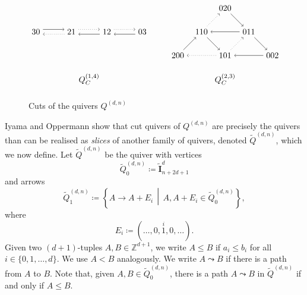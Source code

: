 \documentclass[ALCO,Unicode,published]{cedram}
\newcommand{\derset}[2]{{\tilde{\mathbf{I}}_{#1}^{#2}}}
\newcommand{\st}{\,\middle\vert\,} %
\newcommand{\set}[1]{\left\{#1\right\}} %
\newcommand{\ivec}{E_{i}} %
\newcommand{\tqdn}{\tilde{Q}^{(d, n)}}
\begin{document}
\begin{figure}
\caption{Cuts of the quivers $Q^{(d, n)}$}\label{fig:qdn_cuts}
\[
\begin{tikzpicture}


\begin{scope}[shift={(-3,1)},xscale=1.5]

\node(30) at (0,0) {30};
\node(21) at (1,0) {21};
\node(12) at (2,0) {12};
\node(03) at (3,0) {03};

\draw[transform canvas={yshift=1mm},->] (30) -- (21);
\draw[transform canvas={yshift=-1mm},->,dotted] (21) -- (30);

\draw[transform canvas={yshift=1mm},->,dotted] (21) -- (12);
\draw[transform canvas={yshift=-1mm},->] (12) -- (21);

\draw[transform canvas={yshift=1mm},->,dotted] (12) -- (03);
\draw[transform canvas={yshift=-1mm},->] (03) -- (12);

\node at (1.5,-2) {$Q_{C}^{(1,4)}$};

\end{scope}


\begin{scope}[shift={(3,0)}]

\node(200) at (0,0) {200};
\node(110) at (1,1) {110};
\node(020) at (2,2) {020};
\node(011) at (3,1) {011};
\node(002) at (4,0) {002};
\node(101) at (2,0) {101};

\draw[->] (200) -- (110);
\draw[->,dotted] (110) -- (020);
\draw[->] (020) -- (011);
\draw[->] (011) -- (002);
\draw[->] (002) -- (101);
\draw[->,dotted] (101) -- (200);
\draw[->] (110) -- (101);
\draw[->,dotted] (101) -- (011);
\draw[->] (011) -- (110);

\node at (2,-1) {$Q_{C}^{(2,3)}$};

\end{scope}

\end{tikzpicture}
\]
\end{figure}

Iyama and Oppermann \cite{io} show that cut quivers of $Q^{(d, n)}$ are precisely the quivers than can be realised as \emph{slices} of another family of quivers, denoted $\tqdn$, which we now define. Let $\tilde{Q}^{(d,n)}$ be the quiver with vertices \[\tilde{Q}_{0}^{(d,n)} \coloneqq \derset{n+2d+1}{d}\] and arrows \[\tilde{Q}_{1}^{(d,n)} \coloneqq \set{A \rightarrow A + \ivec \st A, A + \ivec \in \tilde{Q}_{0}^{(d,n)}},\] where \[\ivec\coloneqq (\dots, 0, \overset{i}{1}, 0, \dots).\] Given two $(d + 1)$-tuples $A, B \in \mathbb{Z}^{d + 1}$, we write $A \leqslant B$ if $a_{i} \leqslant b_{i}$ for all $i \in \{0, 1, \dots, d\}$. We use $A < B$ analogously. We write $A \leadsto B$ if there is a path from $A$ to $B$. Note that, given $A, B \in \tilde{Q}_{0}^{(d, n)}$, there is a path $A \leadsto B$ in $\tilde{Q}^{(d, n)}$ if and only if $A \leqslant B$. 
\end{document}
